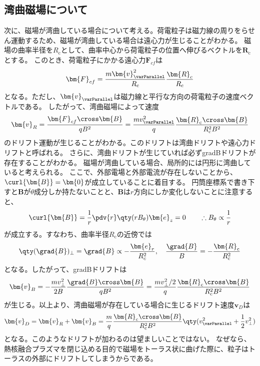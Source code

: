 \subsection{湾曲磁場について}
次に、磁場が湾曲している場合について考える。荷電粒子は磁力線の周りをらせん運動するため、磁場が湾曲している場合は遠心力が生じることがわかる。
磁場の曲率半径を$R_\text{c}$として、曲率中心から荷電粒子の位置へ伸びるベクトルを$\bm{R}_{\text{c}}$とする。
このとき、荷電粒子にかかる遠心力$\bm{F}_{cf}$は
\begin{equation}
	\bm{F}_{cf} = \frac{m\bm{v}^2_{\varParallel}}{R_{\text{c}}}\frac{\bm{R}_{\text{c}}}{R_{\text{c}}}
\end{equation}
となる。ただし、$\bm{v}_{\varParallel}$は磁力線と平行な方向の荷電粒子の速度ベクトルである。
したがって、湾曲磁場によって速度
\begin{equation}
	\bm{v}_{R} = \frac{\bm{F}_{cf}\cross\bm{B}}{qB^2} = \frac{mv^2_{\varParallel}}{q}\frac{\bm{R}_{\text{c}}\cross\bm{B}}{R_{\text{c}}^2B^2}
\end{equation}
のドリフト運動が生じることがわかる。このドリフトは湾曲ドリフトや遠心力ドリフトと呼ばれる。
さらに、湾曲ドリフトが生じていれば必ずgradBドリフトが存在することがわかる。
磁場が湾曲している場合、局所的には円形に湾曲していると考えられる。
ここで、外部電場と外部電流が存在しないことから、$\curl{\bm{B}} = \bm{0}$が成立していることに着目する。
円筒座標系で書き下すと$\bm{B}$が$\theta$成分しか持たないことと、$\bm{B}$は$r$方向にしか変化しないことに注意すると、
\begin{equation}
	\curl{\bm{B}} = \frac{1}{r}\pdv{r}\qty(rB_{\theta})\bm{e}_z = 0\qquad\therefore B_\theta \propto \frac{1}{r}
\end{equation}
が成立する。すなわち、曲率半径$R_{\text{c}}$の近傍では
\begin{equation}
	\qty(\grad{B})_{\perp} = \grad{B} \propto -\frac{\bm{e}_r}{R_{c}^2},\quad\frac{\grad{B}}{B} = -\frac{\bm{R}_{\text{c}}}{R_{\text{c}}^2}
\end{equation}
となる。したがって、gradBドリフトは
\begin{equation}
	\bm{v}_{B} = -\frac{mv^2_{\perp}}{2B}\frac{\grad{B}\cross\bm{B}}{qB^2}
	= \frac{mv^2_{\perp}/2}{q}\frac{\bm{R}_{\text{c}}\cross\bm{B}}{R_{\text{c}}^2B^2}
\end{equation}
が生じる。以上より、湾曲磁場が存在している場合に生じるドリフト速度$\bm{v}_{D}$は
\begin{equation}
	\bm{v}_{D} = \bm{v}_{R} + \bm{v}_{B} = \frac{m}{q}\frac{\bm{R}_{\text{c}}\cross\bm{B}}{R_{\text{c}}^2B^2}\qty(v^2_{\varParallel} + \frac{1}{2}v^2_{\perp})
\end{equation}
となる。このようなドリフトが加わるのは望ましいことではない。
なぜなら、熱核融合プラズマを閉じ込める目的で磁場をトーラス状に曲げた際に、粒子はトーラスの外部にドリフトしてしまうからである。

